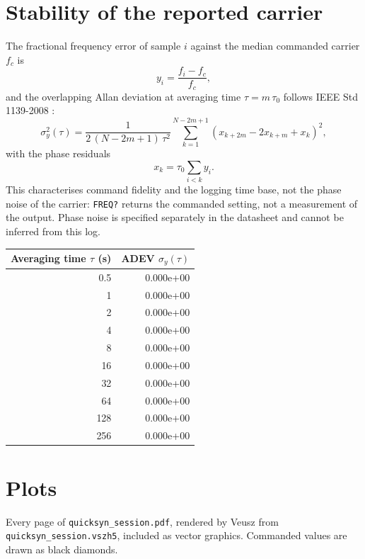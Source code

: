 \documentclass[11pt]{article}
\begin{document}
\section{Stability of the reported carrier}

The fractional frequency error of sample $i$ against the median
commanded carrier $f_c$ is
\begin{equation}
  y_i = \frac{f_i - f_c}{f_c},
\end{equation}
and the overlapping Allan deviation at averaging time $\tau = m\,\tau_0$
follows IEEE Std 1139-2008 \cite{ieee1139}:
\begin{equation}
  \sigma_y^2(\tau) = \frac{1}{2\,(N-2m+1)\,\tau^2}
  \sum_{k=1}^{N-2m+1}\left(x_{k+2m} - 2x_{k+m} + x_k\right)^2,
\end{equation}
with the phase residuals
\begin{equation}
  x_k = \tau_0 \sum_{i<k} y_i .
\end{equation}
This characterises command fidelity and the logging time base, not the
phase noise of the carrier: \texttt{FREQ?} returns the commanded setting,
not a measurement of the output. Phase noise is specified separately in
the datasheet \cite{nidatasheet} and cannot be inferred from this log.

\begin{center}
\begin{tabular}{@{}rr@{}}
\toprule
\textbf{Averaging time $\tau$ (s)} & \textbf{ADEV $\sigma_y(\tau)$} \\
\midrule
0.5 & 0.000e+00 \\
1 & 0.000e+00 \\
2 & 0.000e+00 \\
4 & 0.000e+00 \\
8 & 0.000e+00 \\
16 & 0.000e+00 \\
32 & 0.000e+00 \\
64 & 0.000e+00 \\
128 & 0.000e+00 \\
256 & 0.000e+00 \\
\bottomrule
\end{tabular}
\end{center}

\clearpage
\section{Plots}

Every page of \texttt{quicksyn\_session.pdf}, rendered by
Veusz \cite{veusz} from \texttt{quicksyn\_session.vszh5}, included as vector
graphics. Commanded values are drawn as black diamonds.
\end{document}
